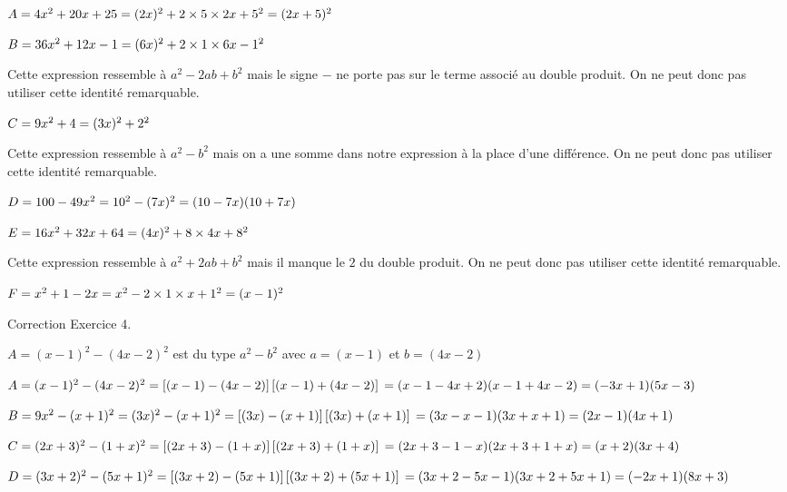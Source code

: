 $A=4x^2+20x+25\\
=(2x)^2+2\times 5\times 2x+5^2\\
=(2x+5)^2$

$B=36x^2+12x-1 \\
=(6x)^2+2\times 1\times 6x-1^2$

Cette expression ressemble à $a^2-2ab+b^2$ mais le signe $-$ ne porte pas sur le terme associé au double produit. On ne peut donc pas utiliser cette identité remarquable.

$C=9x^2+4 \\
=(3x)^2+2^2$

Cette expression ressemble à $a^2-b^2$ mais on a une somme dans notre expression à la place d'une différence. On ne peut donc pas utiliser cette identité remarquable.

$D=100-49x^2\\
=10^2-(7x)^2\\
=(10-7x)(10+7x)$

$E=16x^2+32x+64\\
=(4x)^2+8\times 4x+8^2$

Cette expression ressemble à $a^2+2ab+b^2$ mais il manque le $2$ du double produit. On ne peut donc pas utiliser cette identité remarquable.

$F=x^2+1-2x \\
=x^2-2\times 1\times x+1^2\\
=(x-1)^2$

Correction Exercice 4.

$A=(x-1)^2-(4x-2)^2$ est du type $a^2-b^2$ avec $a=(x-1)$ et $b=(4x-2)$

$ A=(x-1)^2-(4x-2)^2 \\
=\left[(x-1)-(4x-2)\right]\left[(x-1)+(4x-2)\right] \\
=(x-1-4x+2)(x-1+4x-2) \\
=(-3x+1)(5x-3)
$

$ B=9x^2-(x+1)^2 \\
=(3x)^2-(x+1)^2  \\
=\left[(3x)-(x+1)\right]\left[(3x)+(x+1)\right] \\
=(3x-x-1)(3x+x+1) \\
=(2x-1)(4x+1)
$

$ C=(2x+3)^2-(1+x)^2 \\
=\left[(2x+3)-(1+x)\right]\left[(2x+3)+(1+x)\right] \\
=(2x+3-1-x)(2x+3+1+x) \\
=(x+2)(3x+4)
$

$D=(3x+2)^2-(5x+1)^2 \\
=\left[(3x+2)-(5x+1)\right]\left[(3x+2)+(5x+1)\right] \\
=(3x+2-5x-1)(3x+2+5x+1) \\
=(-2x+1)(8x+3)
$

